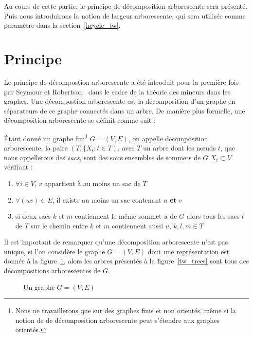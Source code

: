 Au cours de cette partie, le principe de décomposition arborescente sera présenté. Puis nous
introduirons la notion de largeur arborescente, qui sera utilisée comme paramètre dans la
section~\ref{hcycle_tw}.

\section{Principe}

Le principe de décompostion arborescente a été introduit pour la première fois par Seymour et
Robertson~\cite{robalgorithmic} dans le cadre de la théorie des mineurs dans les graphes. Une
décompostion arborescente est la décomposition d'un graphe en séparateurs de ce graphe connectés
dans un arbre. De manière plus formelle, une décomposition arborescente se définit comme suit :

\begin{ndf}
    Étant donné un graphe fini\footnote{Nous ne travaillerons que sur des graphes finis et non
        orientés, même si la notion de de décomposition arborescente peut s'étendre aux graphes
    orientés.} $G = (V, E)$, on appelle décomposition arborescente, la paire $(T, \{X_t : t \in T)$,
    avec $T$ un arbre dont les n\oe uds $t$, que nous appellerons des \emph{sacs}, sont des sous
    ensembles de sommets de $G$ $X_t \subset V$ vérifiant : 
    \begin{enumerate}
        \item $\forall i \in V$, $v$ appartient à au moins un sac de $T$
        \item $\forall (uv) \in E$, il existe au moins un sac contenant $u$ \textbf{et} $v$
        \item si deux sacs $k$ et $m$ contiennent le même sommet $u$ de $G$ alors tous les sacs $l$
            de $T$ sur le chemin entre $k$ et $m$ contiennent aussi $u$, $k, l, m \in T$
    \end{enumerate}
\end{ndf}

Il est important de remarquer qu'une décomposition arborescente n'est pas unique, si l'on considère
le graphe $G = (V, E)$ dont une représentation est donnée à la figure~\ref{tw_g}, alors les arbres
présentés à la figure~\ref{tw_trees} sont tous des décompositions arborescentes de $G$.

\begin{figure}
    \begin{center}
        \begin{tikzpicture}
            
        \end{tikzpicture}
        \caption{Un graphe $G = (V, E)$}
        \label{tw_g}
    \end{center}
\end{figure}

